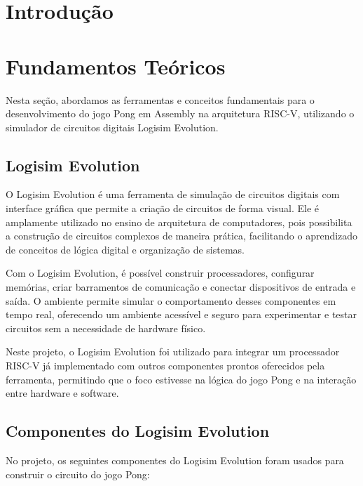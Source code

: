 \documentclass[english, spanish,brazilian]{RBIEarticle} %
\begin{document}
\pagebreak


\section{Introdução}



\section{Fundamentos Teóricos}

Nesta seção, abordamos as ferramentas e conceitos fundamentais para o desenvolvimento do jogo Pong em Assembly na arquitetura RISC-V, utilizando o simulador de circuitos digitais Logisim Evolution.

\subsection{Logisim Evolution}

O Logisim Evolution é uma ferramenta de simulação de circuitos digitais com interface gráfica que permite a criação de circuitos de forma visual. Ele é amplamente utilizado no ensino de arquitetura de computadores, pois possibilita a construção de circuitos complexos de maneira prática, facilitando o aprendizado de conceitos de lógica digital e organização de sistemas.

Com o Logisim Evolution, é possível construir processadores, configurar memórias, criar barramentos de comunicação e conectar dispositivos de entrada e saída. O ambiente permite simular o comportamento desses componentes em tempo real, oferecendo um ambiente acessível e seguro para experimentar e testar circuitos sem a necessidade de hardware físico.

Neste projeto, o Logisim Evolution foi utilizado para integrar um processador RISC-V já implementado com outros componentes prontos oferecidos pela ferramenta, permitindo que o foco estivesse na lógica do jogo Pong e na interação entre hardware e software.

\subsection{Componentes do Logisim Evolution}

No projeto, os seguintes componentes do Logisim Evolution foram usados para construir o circuito do jogo Pong:
\end{document}
